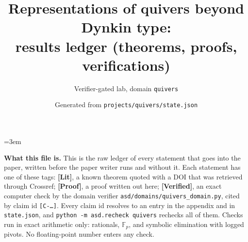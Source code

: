 \documentclass[11pt]{article}
\title{Representations of quivers beyond Dynkin type:\\ results ledger (theorems, proofs, verifications)}
\author{Verifier-gated lab, domain \texttt{quivers}}
\date{Generated from \texttt{projects/quivers/state.json}}
\theoremstyle{definition}\newtheorem{definition}[theorem]{Definition}\newtheorem{remark}[theorem]{Remark}\newtheorem{observation}[theorem]{Numerical observation}
\newcommand{\C}[1]{\texttt{[C-#1]}}
\begin{document}
\maketitle\sloppy\emergencystretch=3em

\noindent\textbf{What this file is.} This is the raw ledger of every statement that goes into the paper, written before the paper
writer runs and without it. Each statement has one of these tags:
\textbf{[Lit]}, a known theorem quoted with a DOI that was retrieved through Crossref;
\textbf{[Proof]}, a proof written out here;
\textbf{[Verified]}, an exact computer check by the domain verifier \texttt{asd/domains/quivers\_domain.py}, cited by claim id \C{\ldots}.
Every claim id resolves to an entry in the appendix and in \texttt{state.json}, and
\texttt{python -m asd.recheck quivers} rechecks all of them. Checks run in exact arithmetic only: rationals, $\mathbb F_p$,
and symbolic elimination with logged pivots. No floating-point number enters any check.
\end{document}
